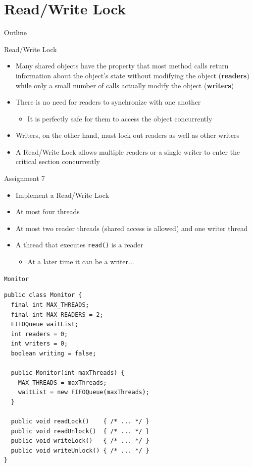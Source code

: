\section{Read/Write Lock}

\begin{frame}{Outline}
  \tableofcontents[current]
\end{frame}

\begin{frame}{Read/Write Lock}
  \begin{itemize}
  \item Many shared objects have the property that most method calls
    return information about the object's state without modifying the
    object ({\bf readers}) while only a small number of calls actually
    modify the object ({\bf writers})
  \item There is no need for readers to synchronize with one another
    \begin{itemize}
    \item It is perfectly safe for them to access the object
      concurrently
    \end{itemize}
  \item Writers, on the other hand, must lock out readers as well as
    other writers
  \item A Read/Write Lock allows multiple readers or a single
    writer to enter the critical section concurrently
  \end{itemize}
\end{frame}

\begin{frame}{Assignment 7}
  \begin{itemize}
  \item Implement a Read/Write Lock
  \item At most four threads
  \item At most two reader threads (shared access is allowed) and one
    writer thread
  \item A thread that executes \lstinline!read()! is a reader
    \begin{itemize}
    \item At a later time it can be a writer...
    \end{itemize}
  \end{itemize}
\end{frame}

\begin{frame}[fragile]{\lstinline!Monitor!}
\begin{lstlisting}[basicstyle=\fontsize{10}{12}\selectfont\ttfamily]
public class Monitor {
  final int MAX_THREADS;
  final int MAX_READERS = 2;
  FIFOQueue waitList;
  int readers = 0;
  int writers = 0;
  boolean writing = false;
  
  public Monitor(int maxThreads) {
    MAX_THREADS = maxThreads;
    waitList = new FIFOQueue(maxThreads);
  }  
  
  public void readLock()    { /* ... */ }
  public void readUnlock()  { /* ... */ }
  public void writeLock()   { /* ... */ }
  public void writeUnlock() { /* ... */ }
}
\end{lstlisting}
\end{frame}

